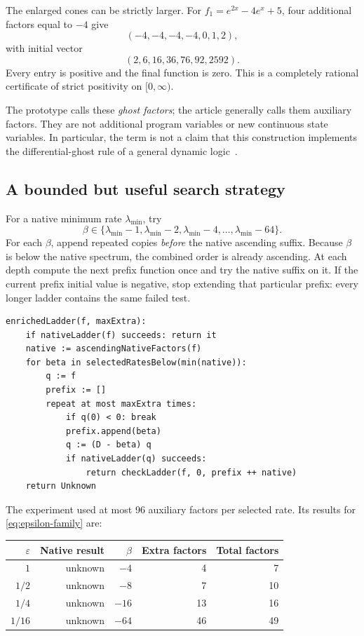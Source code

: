 The enlarged cones can be strictly larger. For $f_1=e^{2x}-4e^x+5$, four
additional factors equal to $-4$ give
\[
 (-4,-4,-4,-4,0,1,2),
\]
with initial vector
\[
 (2,6,16,36,76,92,2592).
\]
Every entry is positive and the final function is zero. This is a completely
rational certificate of strict positivity on $[0,\infty)$.

The prototype calls these \emph{ghost factors}; the article generally calls
them auxiliary factors. They are not additional program variables or new
continuous state variables. In particular, the term is not a claim that this
construction implements the differential-ghost rule of a general dynamic
logic~\cite{differential-invariance}.

\subsection{A bounded but useful search strategy}

For a native minimum rate $\lambda_{\min}$, try
\[
 \beta\in\{\lambda_{\min}-1,\lambda_{\min}-2,
           \lambda_{\min}-4,\ldots,\lambda_{\min}-64\}.
\]
For each $\beta$, append repeated copies \emph{before} the native ascending
suffix. Because $\beta$ is below the native spectrum, the combined order is
already ascending. At each depth compute the next prefix function once and try
the native suffix on it. If the current prefix initial value is negative,
stop extending that particular prefix: every longer ladder contains the same
failed test.

\par\noindent\begin{minipage}{\linewidth}
\begin{lstlisting}
enrichedLadder(f, maxExtra):
    if nativeLadder(f) succeeds: return it
    native := ascendingNativeFactors(f)
    for beta in selectedRatesBelow(min(native)):
        q := f
        prefix := []
        repeat at most maxExtra times:
            if q(0) < 0: break
            prefix.append(beta)
            q := (D - beta) q
            if nativeLadder(q) succeeds:
                return checkLadder(f, 0, prefix ++ native)
    return Unknown
\end{lstlisting}
\end{minipage}\par

The experiment used at most 96 auxiliary factors per selected rate. Its
results for \eqref{eq:epsilon-family} are:

\begin{center}
\begin{tabular}{@{}rrrrr@{}}
\toprule
$\varepsilon$ & Native result & $\beta$ & Extra factors & Total factors\\
\midrule
$1$    & unknown & $-4$  & 4  & 7\\
$1/2$  & unknown & $-8$  & 7  & 10\\
$1/4$  & unknown & $-16$ & 13 & 16\\
$1/16$ & unknown & $-64$ & 46 & 49\\
\bottomrule
\end{tabular}
\end{center}

